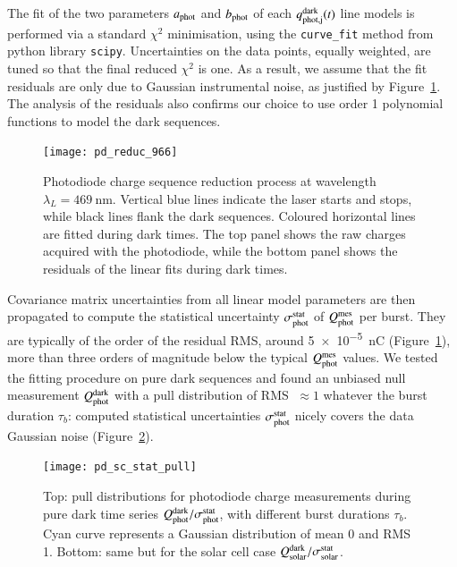 The fit of the two parameters $a_{\rm phot}$ and $b_{\rm phot}$ of each $q_{\rm phot,j}^{\rm dark}(t)$ line models is performed via a standard $\chi^2$ minimisation, using the \texttt{curve\_fit} method from python library \texttt{scipy}. Uncertainties on the data points, equally weighted, are tuned so that the final reduced $\chi^2$ is one. As a result, we assume that the fit residuals are only due to Gaussian instrumental noise, as justified by Figure~\ref{fig:pd_reduc}. The analysis of the residuals also confirms our choice to use order 1 polynomial functions to model the dark sequences.

\begin{figure}[!h]
\centering
\texttt{[image: pd\_reduc\_966]}
\caption{Photodiode charge sequence reduction process at wavelength $\lambda_L=\SI{469}{\nm}$. Vertical blue lines indicate the laser starts and stops, while black lines flank the dark sequences. Coloured horizontal lines are fitted during dark times. The top panel shows the raw charges acquired with the photodiode, while the bottom panel shows the residuals of the linear fits during dark times.}\label{fig:pd_reduc}
\end{figure}

Covariance matrix uncertainties from all linear model parameters are then propagated to compute the statistical uncertainty $\sigma_{\mathrm{phot}}^{\mathrm{stat}}$ of $Q_{\mathrm{phot}}^{\mathrm{mes}}$ per burst. They are typically of the order of the residual RMS, around \SI{5e-5}{\nano\coulomb} (Figure~\ref{fig:pd_reduc}), more than three orders of magnitude below the typical $Q_{\mathrm{phot}}^{\mathrm{mes}}$ values. We tested the fitting procedure on pure dark sequences and found an unbiased null measurement $Q_{\mathrm{phot}}^{\rm dark}$ with a pull distribution of RMS $\;\approx 1$ whatever the burst duration $\tau_b$: computed statistical uncertainties $\sigma_{\mathrm{phot}}^{\mathrm{stat}}$ nicely covers the data Gaussian noise (Figure~\ref{fig:charge_pull}).

\begin{figure}[!h]
\centering
\texttt{[image: pd\_sc\_stat\_pull]}
\caption{Top: pull distributions for photodiode charge measurements during pure dark time series $Q_{\mathrm{phot}}^{\rm dark} / \sigma_{\mathrm{phot}}^{\mathrm{stat}}$, with different burst durations $\tau_b$. Cyan curve represents a Gaussian distribution of mean 0 and RMS 1. Bottom: same but for the solar cell case $Q_{\mathrm{solar}}^{\rm dark} / \sigma_{\mathrm{solar}}^{\mathrm{stat}}$.}\label{fig:charge_pull}
\end{figure}



